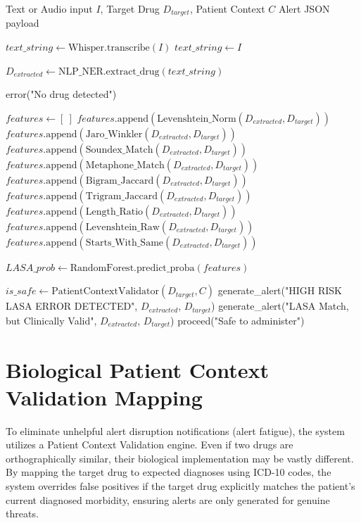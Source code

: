 \documentclass[12pt,a4paper]{report}
\begin{document}
\begin{algorithm}[H]
\caption{LASA Prediction and Context Validation Algorithm}
\begin{algorithmic}[1]
\Require Text or Audio input $I$, Target Drug $D_{target}$, Patient Context $C$
\Ensure Alert JSON payload

    \State $text\_string \gets \text{Whisper.transcribe}(I)$
\Else
    \State $text\_string \gets I$
\EndIf

\State $D_{extracted} \gets \text{NLP\_NER.extract\_drug}(text\_string)$

    \State \Return error("No drug detected")
\EndIf

\State $features \gets [~]$
\State $features.\text{append}(\text{Levenshtein\_Norm}(D_{extracted}, D_{target}))$
\State $features.\text{append}(\text{Jaro\_Winkler}(D_{extracted}, D_{target}))$
\State $features.\text{append}(\text{Soundex\_Match}(D_{extracted}, D_{target}))$
\State $features.\text{append}(\text{Metaphone\_Match}(D_{extracted}, D_{target}))$
\State $features.\text{append}(\text{Bigram\_Jaccard}(D_{extracted}, D_{target}))$
\State $features.\text{append}(\text{Trigram\_Jaccard}(D_{extracted}, D_{target}))$
\State $features.\text{append}(\text{Length\_Ratio}(D_{extracted}, D_{target}))$
\State $features.\text{append}(\text{Levenshtein\_Raw}(D_{extracted}, D_{target}))$
\State $features.\text{append}(\text{Starts\_With\_Same}(D_{extracted}, D_{target}))$

\State $LASA\_prob \gets \text{RandomForest.predict\_proba}(features)$

    \State $is\_safe \gets \text{PatientContextValidator}(D_{target}, C)$
        \State \Return generate\_alert("HIGH RISK LASA ERROR DETECTED", $D_{extracted}$, $D_{target}$)
    \Else
        \State \Return generate\_alert("LASA Match, but Clinically Valid", $D_{extracted}$, $D_{target}$)
    \EndIf
\Else
    \State \Return proceed("Safe to administer")
\EndIf
\end{algorithmic}
\end{algorithm}

\section{Biological Patient Context Validation Mapping}
To eliminate unhelpful alert disruption notifications (alert fatigue), the system utilizes a Patient Context Validation engine. Even if two drugs are orthographically similar, their biological implementation may be vastly different. By mapping the target drug to expected diagnoses using ICD-10 codes, the system overrides false positives if the target drug explicitly matches the patient's current diagnosed morbidity, ensuring alerts are only generated for genuine threats.
\end{document}
